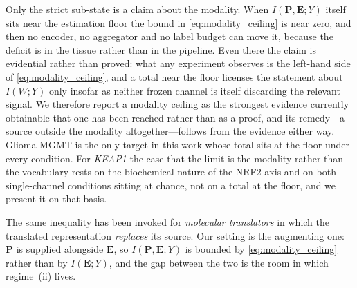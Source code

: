 Only the strict sub-state is a claim about the modality. When
$I(\mathbf{P},\mathbf{E};Y)$ itself sits near the estimation floor the
bound in \cref{eq:modality_ceiling} is near zero, and then no encoder,
no aggregator and no label budget can move it, because the deficit is in
the tissue rather than in the pipeline. Even there the claim is
evidential rather than proved: what any experiment observes is the
left-hand side of \cref{eq:modality_ceiling}, and a total near the floor
licenses the statement about $I(W;Y)$ only insofar as neither frozen
channel is itself discarding the relevant signal. We therefore report a
modality ceiling as the strongest evidence currently obtainable that one
has been reached rather than as a proof, and its remedy---a source
outside the modality altogether---follows from the evidence either way.
Glioma MGMT is the only target in this work whose total sits at the
floor under every condition. For \textit{KEAP1} the case that the limit
is the modality rather than the vocabulary rests on the biochemical
nature of the NRF2 axis and on both single-channel conditions sitting at
chance, not on a total at the floor, and we present it on that basis.

The same inequality has been invoked for \emph{molecular translators}
in which the translated representation \emph{replaces} its
source.\cite{saisan2026ceilings} Our setting is the augmenting one:
$\mathbf{P}$ is supplied alongside $\mathbf{E}$, so
$I(\mathbf{P},\mathbf{E};Y)$ is bounded by \cref{eq:modality_ceiling}
rather than by $I(\mathbf{E};Y)$, and the gap between the two is the
room in which regime~(ii) lives.

